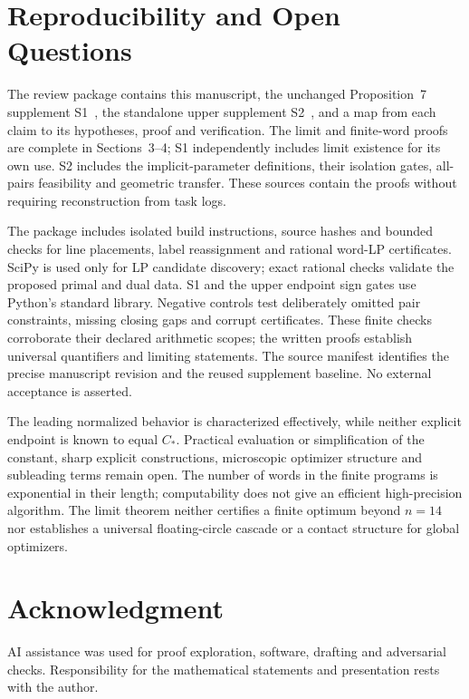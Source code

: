 \documentclass[11pt,letterpaper]{article}
\theoremstyle{definition}\newtheorem{definition}[theorem]{Definition}
\theoremstyle{remark}\newtheorem{remark}[theorem]{Remark}
\newcommand{\CC}{C_\ast}
\begin{document}
\section{Reproducibility and Open Questions}

The review package contains this manuscript, the unchanged Proposition~7
supplement S1~\cite{lower}, the standalone upper supplement S2~\cite{upper},
and a map from each claim to its hypotheses, proof and verification. The
limit and finite-word proofs are complete in Sections~3--4; S1 independently includes
limit existence for its own use. S2 includes the implicit-parameter
definitions, their isolation gates, all-pairs feasibility and geometric
transfer. These sources contain the proofs without requiring reconstruction
from task logs.

The package includes isolated build instructions, source hashes and bounded
checks for line placements, label reassignment and rational word-LP
certificates. SciPy is used only for LP candidate discovery; exact rational
checks validate the proposed primal and dual data. S1 and the upper endpoint
sign gates use Python's standard library. Negative controls test deliberately
omitted pair constraints, missing closing gaps and corrupt certificates.
These finite checks corroborate their declared arithmetic scopes; the
written proofs establish universal quantifiers and limiting statements.
The source manifest identifies the precise manuscript revision and the
reused supplement baseline. No external acceptance is asserted.

The leading normalized behavior is characterized effectively, while neither
explicit endpoint is known to equal $\CC$. Practical evaluation or
simplification of the constant, sharp explicit constructions, microscopic
optimizer structure and subleading terms remain open. The number of words
in the finite programs is exponential in their length; computability does
not give an efficient high-precision algorithm. The limit theorem neither
certifies a finite optimum beyond $n=14$ nor establishes a universal
floating-circle cascade or a contact structure for global optimizers.

\section*{Acknowledgment}
AI assistance was used for proof exploration, software, drafting and
adversarial checks. Responsibility for the mathematical statements and
presentation rests with the author.
\end{document}
